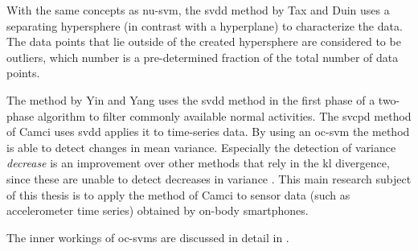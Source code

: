 With the same concepts as \gls{nu-svm}, the \gls{svdd} method by Tax and Duin \cite{tax1999support,tax2004support} uses a separating hypersphere (in contrast with a hyperplane) to characterize the data.
The data points that lie outside of the created hypersphere are considered to be outliers, which number is a pre-determined fraction of the total number of data points.

The method by Yin and Yang \cite{yin2008sensor} uses the \gls{svdd} method in the first phase of a two-phase algorithm to filter commonly available normal activities.
The \gls{svcpd} method of Camci \cite{camci2010change} uses \gls{svdd} applies it to time-series data.
By using an \gls{oc-svm} the method is able to detect changes in mean variance.
Especially the detection of variance \emph{decrease} is an improvement over other methods that rely in the \gls{kl} divergence, since these are unable to detect decreases in variance \cite{takeuchi2006unifying}.
This main research subject of this thesis is to apply the method of Camci \cite{camci2010change} to sensor data (such as accelerometer time series) obtained by on-body smartphones.

The inner workings of \glspl{oc-svm} are discussed in detail in .





